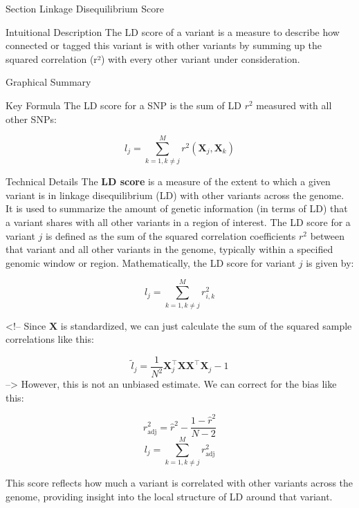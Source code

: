 
\begin{frame}{Section}
\centering
\Huge{Linkage Disequilibrium Score}
\end{frame}


\begin{frame}{Intuitional Description}
The LD score of a variant is a measure to describe how connected or tagged this variant is with other variants by summing up the squared correlation (r²) with every other variant under consideration.

\end{frame}

\begin{frame}{Graphical Summary}

\end{frame}


\begin{frame}{Key Formula}
The LD score for a SNP is the sum of LD $r^2$ measured with all other SNPs:

$$
l_j = \sum_{k=1, k \neq j}^M r^2(\textbf{X}_j, \textbf{X}_k)
$$
\end{frame}


\begin{frame}{Technical Details}
The \textbf{LD score} is a measure of the extent to which a given variant is in linkage disequilibrium (LD) with other variants across the genome. It is used to summarize the amount of genetic information (in terms of LD) that a variant shares with all other variants in a region of interest. The LD score for a variant $j$ is defined as the sum of the squared correlation coefficients $r^2$ between that variant and all other variants in the genome, typically within a specified genomic window or region. Mathematically, the LD score for variant $j$ is given by:

$$
l_j = \sum_{k=1, k \neq j}^M r^2_{i,k}
$$

<!-- Since $\textbf{X}$ is standardized, we can just calculate the sum of the squared sample correlations like this:

$$\widetilde{l}_{j} = \frac{1}{N^2}\textbf{X}^\top_j\textbf{X}\textbf{X}^\top\textbf{X}_j - 1$$ -->
However, this is not an unbiased estimate. We can correct for the bias like this:

$$
r_\text{adj}^2 =  \hat{r}^2 - \frac{1-\hat{r}^2}{N-2}
$$
$$
l_j = \sum_{k=1, k \neq j}^M  r_\text{adj}^2 
$$

This score reflects how much a variant is correlated with other variants across the genome, providing insight into the local structure of LD around that variant.

\end{frame}

